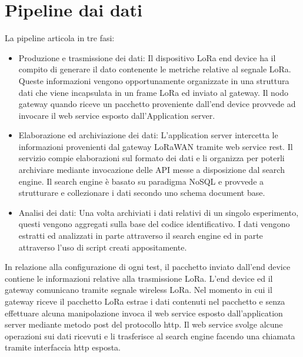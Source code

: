 \documentclass[12pt,a4paper,openright,twoside]{report}
\begin{document}
\section{Pipeline dai dati}
La pipeline articola in tre fasi: 
\begin{itemize}                       
\item Produzione e trasmissione dei dati: Il dispositivo LoRa end device ha il compito di generare il dato contenente le metriche relative al segnale LoRa. Queste informazioni vengono opportunamente organizzate in una struttura dati che viene incapsulata in un frame LoRa ed inviato al gateway. Il nodo gateway quando riceve un pacchetto proveniente dall'end device provvede ad invocare il web service esposto dall'Application server.
\item Elaborazione ed archiviazione dei dati: L'application server intercetta le informazioni provenienti dal gateway LoRaWAN tramite web service rest. Il servizio compie elaborazioni sul formato dei dati e li organizza per poterli archiviare mediante invocazione delle API messe a disposizione dal search engine. Il search engine \`e basato su paradigma NoSQL e provvede a strutturare e collezionare i dati secondo uno schema document base.
\item Analisi dei dati: Una volta archiviati i dati relativi di un singolo esperimento, questi vengono aggregati sulla base del codice identificativo. I dati vengono estratti ed analizzati in parte attraverso il search engine ed in parte attraverso l'uso di script creati appositamente.   
\end{itemize}
In relazione alla configurazione di ogni test, il pacchetto inviato dall'end device contiene le informazioni relative alla trasmissione LoRa.
L'end device ed il gateway comunicano tramite segnale wireless LoRa. Nel momento in cui il gateway riceve il pacchetto LoRa estrae i dati contenuti nel pacchetto e senza effettuare alcuna manipolazione invoca il web service esposto dall'application server mediante metodo post del protocollo http. Il web service svolge alcune operazioni sui dati ricevuti e li trasferisce al search engine facendo una chiamata tramite interfaccia http esposta.  
\end{document}
